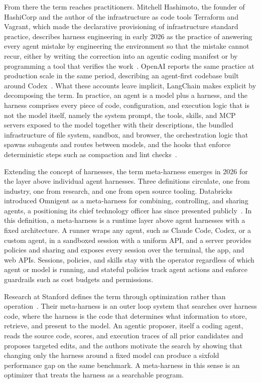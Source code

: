 \documentclass[
english,                 %
bibtex,                  %
]{kththesis}
\numberwithin{listing}{chapter}
\begin{document}
From there the term reaches practitioners. Mitchell Hashimoto, the founder of HashiCorp and the author of the infrastructure as code tools Terraform and Vagrant, which made the declarative provisioning of infrastructure standard practice, describes harness engineering in early 2026 as the practice of answering every agent mistake by engineering the environment so that the mistake cannot recur, either by writing the correction into an agentic coding manifest or by programming a tool that verifies the work~\cite{hashimoto_my_2026}. \Gls{OpenAI} reports the same practice at production scale in the same period, describing an agent-first codebase built around Codex~\cite{openai_harness_2026}. What these accounts leave implicit, LangChain makes explicit by decomposing the term. In practice, an agent is a model plus a harness, and the harness comprises every piece of code, configuration, and execution logic that is not the model itself, namely the system prompt, the tools, skills, and \gls{MCP} servers exposed to the model together with their descriptions, the bundled infrastructure of file system, sandbox, and browser, the orchestration logic that spawns subagents and routes between models, and the hooks that enforce deterministic steps such as compaction and lint checks~\cite{trivedy_anatomy_2026}.

Extending the concept of harnesses, the term meta-harness emerges in 2026 for the layer above individual agent harnesses. Three definitions circulate, one from industry, one from research, and one from open source tooling. Databricks introduced Omnigent as a meta-harness for combining, controlling, and sharing agents, a positioning its chief technology officer has since presented publicly~\cite{zaharia_introducing_2026, ball_altimeter_2026}. In this definition, a meta-harness is a runtime layer above agent harnesses with a fixed architecture. A runner wraps any agent, such as Claude Code, Codex, or a custom agent, in a sandboxed session with a uniform \gls{API}, and a server provides policies and sharing and exposes every session over the terminal, the app, and web \glspl{API}. Sessions, policies, and skills stay with the operator regardless of which agent or model is running, and stateful policies track agent actions and enforce guardrails such as cost budgets and permissions.

Research at Stanford defines the term through optimization rather than operation~\cite{lee_meta-harness_2026}. Their meta-harness is an outer loop system that searches over harness code, where the harness is the code that determines what information to store, retrieve, and present to the model. An agentic proposer, itself a coding agent, reads the source code, scores, and execution traces of all prior candidates and proposes targeted edits, and the authors motivate the search by showing that changing only the harness around a fixed model can produce a sixfold performance gap on the same benchmark. A meta-harness in this sense is an optimizer that treats the harness as a searchable program.
\end{document}

